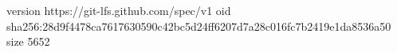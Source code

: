 version https://git-lfs.github.com/spec/v1
oid sha256:28d9f4478ca7617630590c42bc5d24ff6207d7a28c016fc7b2419e1da8536a50
size 5652
